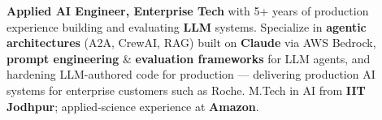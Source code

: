 \documentclass[letter,10pt]{article}
\begin{document}

\textbf{Applied AI Engineer, Enterprise Tech} with 5+ years of production experience building and evaluating \textbf{LLM} systems.
Specialize in \textbf{agentic architectures} (A2A, CrewAI, RAG) built on \textbf{Claude} via AWS Bedrock, \textbf{prompt engineering} \& \textbf{evaluation frameworks} for LLM agents, and hardening LLM-authored code for production --- delivering production AI systems for enterprise customers such as Roche.
M.Tech in AI from \textbf{IIT Jodhpur}; applied-science experience at \textbf{Amazon}.
\end{document}
